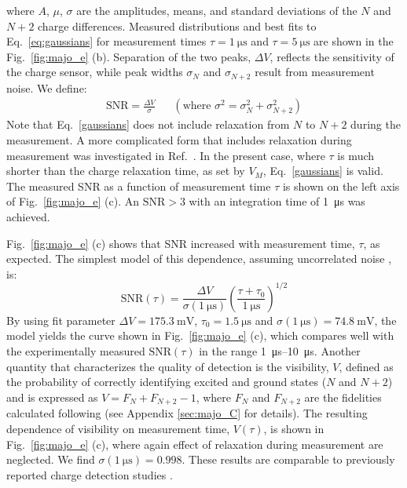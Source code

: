 where $A$, $\mu$, $\sigma$ are the amplitudes, means, and standard deviations of the $N$ and $N+2$ charge differences. Measured distributions and best fits to Eq.~\eqref{eq:gaussians} for measurement times $\tau = \SI{1}{\micro\second}$ and $\tau = \SI{5}{\micro\second}$ are shown in the Fig.~\ref{fig:majo_e} (b). Separation of the two peaks, $\Delta V$, reflects the sensitivity of the charge sensor, while peak widths $\sigma_{N}$ and $\sigma_{N+2}$ result from measurement noise. We define:
\begin{align}
	\textrm{SNR} = \frac{\Delta V}{\sigma} && (\textrm{where }\sigma^{2} = \sigma_{N}^2+\sigma_{N+2}^2)
\end{align}
Note that Eq.~\eqref{gaussians} does not include relaxation from $N$ to $N+2$ during the measurement. A more complicated form that includes relaxation during measurement was investigated in Ref.~\cite{barthel2009rapid}. In the present case, where $\tau$ is much shorter than the charge relaxation time, as set by $V_{M}$, Eq.~\eqref{gaussians} is valid. The measured SNR as a function of measurement time $\tau$ is shown on the left axis of Fig.~\ref{fig:majo_e} (c). An $\textrm{SNR} > 3$ with an integration time of \SI{1}{\micro\second} was achieved.

Fig.~\ref{fig:majo_e} (c) shows that SNR increased with measurement time, $\tau$, as expected. The simplest model of this dependence, assuming uncorrelated noise \cite{sensingdot}, is:
\begin{equation}
	\textrm{SNR}(\tau) = \frac{\Delta V}{\sigma(\SI{1}{\micro\second})}\left(\frac{\tau+\tau_{0}}{\SI{1}{\micro\second}}\right)^{1/2}
\end{equation}
By using fit parameter $\Delta V = \SI{175.3}{\milli\volt}$, $\tau_{0} = \SI{1.5}{\micro\second}$ and $\sigma(\SI{1}{\micro\second}) = \SI{74.8}{\milli\volt}$, the model yields the curve shown in Fig.~\ref{fig:majo_e} (c), which compares well with the experimentally measured $\textrm{SNR}(\tau)$ in the range \SIrange{1}{10}{\micro\second}. Another quantity that characterizes the quality of detection is the visibility, $V$, defined as the probability of correctly identifying excited and ground states ($N$ and $N+2$) and is expressed as $V = F_{N} + F_{N+2} - 1$, where $F_{N}$ and $F_{N+2}$ are the fidelities calculated following \cite{barthel2009rapid} (see Appendix \ref{sec:majo_C} for details). The resulting dependence of visibility on measurement time, $V(\tau)$, is shown in Fig.~\ref{fig:majo_e} (c), where again effect of relaxation during measurement are neglected. We find $\sigma(\SI{1}{\micro\second}) = 0.998$. These results are comparable to previously reported charge detection studies \cite{PhysRevApplied.11.044061,spin6,sens2,sens3,rf_nw2}.

